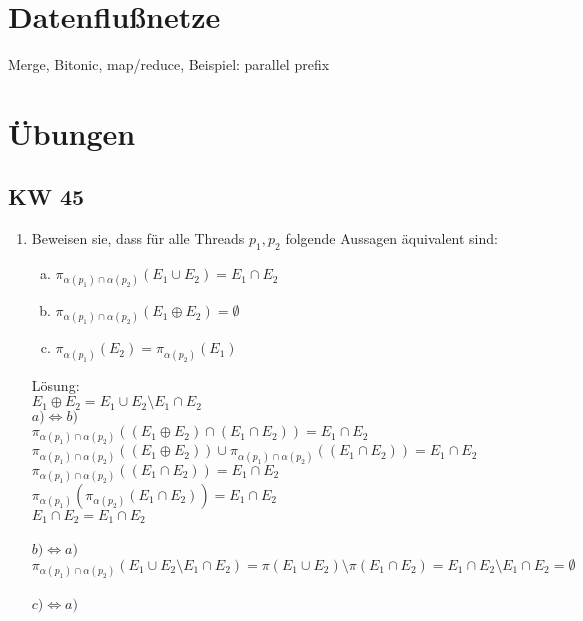 \documentclass[a4paper,12pt]{scrartcl}
\begin{document}
\begin{enumerate}[(a)]
 \end{enumerate}


\section{Datenflußnetze}
Merge, Bitonic, map/reduce, Beispiel: parallel prefix


\section{Übungen}
\subsection{KW 45}
\begin{enumerate}
 \item Beweisen sie, dass für alle Threads $p_1,p_2$ folgende Aussagen äquivalent sind:
 \begin{enumerate}[(a)]
  \item $\pi_{\alpha(p_1)\cap\alpha(p_2)}(E_1\cup E_2) = E_1 \cap E_2 $
  \item  $\pi_{\alpha(p_1)\cap\alpha(p_2)}(E_1\oplus E_2) = \emptyset$
  \item  $\pi_{\alpha(p_1)}(E_2) =\pi_{\alpha(p_2)}(E_1)$
 \end{enumerate}
 
 Lösung:\\
 $E_1\oplus E_2 = E_1 \cup E_2 \setminus E_1\cap E_2$\\
 $a) \Leftrightarrow b)$\\
 $\pi_{\alpha(p_1)\cap\alpha(p_2)}((E_1\oplus E_2) \cap (E_1\cap E_2)) = E_1 \cap E_2$\\
 $\pi_{\alpha(p_1)\cap\alpha(p_2)}((E_1\oplus E_2))\cup \pi_{\alpha(p_1)\cap\alpha(p_2)}((E_1\cap E_2)) = E_1 \cap E_2$\\
 $\pi_{\alpha(p_1)\cap\alpha(p_2)}((E_1\cap E_2)) = E_1 \cap E_2$\\
 $\pi_{\alpha(p_1)}(\pi_{\alpha(p_2)}(E_1\cap E_2)) = E_1 \cap E_2 $\\
 $E_1 \cap E_2 = E_1 \cap E_2$\\
 \\
 $b) \Leftrightarrow a)$\\
 $\pi_{\alpha(p_1)\cap\alpha(p_2)}(E_1\cup E_2 \setminus E_1\cap E_2) = \pi(E_1\cup E_2) \setminus \pi(E_1\cap E_2) = E_1 \cap E_2 \setminus E_1 \cap E_2 = \emptyset$\\
 \\
 $c) \Leftrightarrow a)$\\
 
 
\end{enumerate}
\end{document}
